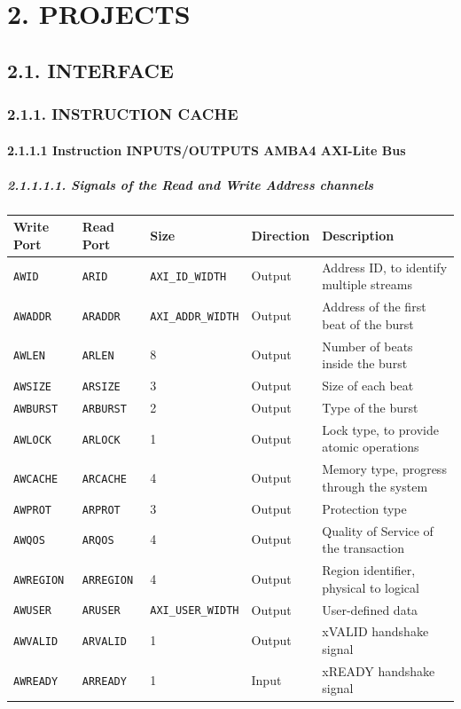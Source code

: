 \documentclass[]{article}
\let\oldparagraph\paragraph
\renewcommand{\paragraph}[1]{\oldparagraph{#1}\mbox{}}
\let\oldsubparagraph\subparagraph
\renewcommand{\subparagraph}[1]{\oldsubparagraph{#1}\mbox{}}
\begin{document}
\section{2. PROJECTS}\label{projects}

\subsection{2.1. INTERFACE}\label{interface}

\subsubsection{2.1.1. INSTRUCTION CACHE}\label{instruction-cache}

\paragraph{2.1.1.1 Instruction INPUTS/OUTPUTS AMBA4 AXI-Lite
Bus}\label{instruction-inputsoutputs-amba4-axi-lite-bus}

\subparagraph{2.1.1.1.1. Signals of the Read and Write Address
channels}\label{signals-of-the-read-and-write-address-channels}

\begin{longtable}[]{@{}lllll@{}}
\toprule
Write Port & Read Port & Size & Direction & Description\tabularnewline
\midrule
\endhead
\texttt{AWID} & \texttt{ARID} & \texttt{AXI\_ID\_WIDTH} & Output &
Address ID, to identify multiple streams\tabularnewline
\texttt{AWADDR} & \texttt{ARADDR} & \texttt{AXI\_ADDR\_WIDTH} & Output &
Address of the first beat of the burst\tabularnewline
\texttt{AWLEN} & \texttt{ARLEN} & 8 & Output & Number of beats inside
the burst\tabularnewline
\texttt{AWSIZE} & \texttt{ARSIZE} & 3 & Output & Size of each
beat\tabularnewline
\texttt{AWBURST} & \texttt{ARBURST} & 2 & Output & Type of the
burst\tabularnewline
\texttt{AWLOCK} & \texttt{ARLOCK} & 1 & Output & Lock type, to provide
atomic operations\tabularnewline
\texttt{AWCACHE} & \texttt{ARCACHE} & 4 & Output & Memory type, progress
through the system\tabularnewline
\texttt{AWPROT} & \texttt{ARPROT} & 3 & Output & Protection
type\tabularnewline
\texttt{AWQOS} & \texttt{ARQOS} & 4 & Output & Quality of Service of the
transaction\tabularnewline
\texttt{AWREGION} & \texttt{ARREGION} & 4 & Output & Region identifier,
physical to logical\tabularnewline
\texttt{AWUSER} & \texttt{ARUSER} & \texttt{AXI\_USER\_WIDTH} & Output &
User-defined data\tabularnewline
\texttt{AWVALID} & \texttt{ARVALID} & 1 & Output & xVALID handshake
signal\tabularnewline
\texttt{AWREADY} & \texttt{ARREADY} & 1 & Input & xREADY handshake
signal\tabularnewline
\bottomrule
\end{longtable}
\end{document}
